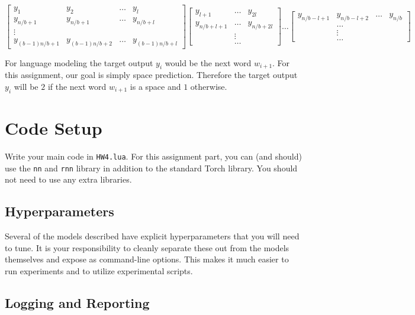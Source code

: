 \documentclass[11pt]{article}
\begin{document}
\[
  \begin{bmatrix}
    y_1 & y_2 & \ldots & y_{l}\\
    y_{n/b+1} & y_{n/b+1} & \ldots & y_{n/b+l}\\
    \vdots \\
    y_{(b-1)n/b + 1} & y_{(b-1)n/b+2} & \ldots & y_{(b-1)n/b+l}
  \end{bmatrix}   \begin{bmatrix}
    y_{l+1} &  \ldots & y_{2l} \\
    y_{n/b+l+1} &  \ldots & y_{n/b+2l}\\
    & \vdots & \\
    & \ldots &  
  \end{bmatrix}
  \ldots
  \begin{bmatrix}
    y_{n/b-l+1} & y_{n/b-l+2} & \ldots & y_{n/b}\\
    & \ldots & \\
    & \vdots & \\
    & \ldots & 
  \end{bmatrix}
\] 

For language modeling the target output $y_i$ would be the next word
$w_{i+1}$.  For this assignment, our goal is simply space
prediction. Therefore the target output $y_i$ will be $2$ if the next
word $w_{i+1}$ is a space and $1$ otherwise.

\section{Code Setup}

Write your main code in \texttt{HW4.lua}. For this assignment part,
you can (and should) use the \texttt{nn} and \texttt{rnn} library in addition to the
standard Torch library. You should not need to use any extra libraries.

\subsection{Hyperparameters}

Several of the models described have explicit hyperparameters that you will 
need to tune. It is your responsibility to cleanly separate these out from 
the models themselves and expose as command-line options. This makes it much 
easier to run experiments and to utilize experimental scripts. 

\subsection{Logging and Reporting}
\end{document}
